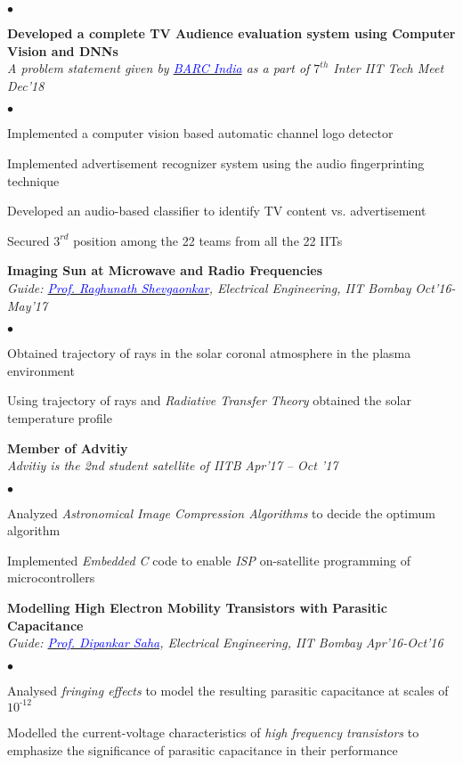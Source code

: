 \documentclass[margin,line, 9pt]{res}
\newenvironment{list2}{
  \begin{list}{$\bullet$}{%
      \setlength{\itemsep}{0.03in}
      \setlength{\parsep}{0in} \setlength{\parskip}{0in}
      \setlength{\topsep}{0in} \setlength{\partopsep}{0in} 
      \setlength{\leftmargin}{0.2in}}}{\end{list}}
\begin{document}
\begin{resume}
\begin{list2}
\end{list2}
% 
% 
{\bf Developed a complete TV Audience evaluation system using Computer Vision and DNNs} \\
{\em A problem statement given by \href{https://www.barcindia.co.in}{\textcolor{blue}{BARC India}} as a part of $7^{th}$ Inter IIT Tech Meet} \hfill {\it Dec'18}\\
\vspace*{-.13in}
\begin{list2}
\item Implemented a computer vision based automatic channel logo detector
\item Implemented advertisement recognizer system using the audio fingerprinting technique
\item Developed an audio-based classifier to identify TV content vs. advertisement
\item Secured $3^{rd}$ position among the 22 teams from all the 22 IITs
\end{list2}


{\bf Imaging Sun at Microwave and Radio Frequencies} \\
{\em Guide: \href{https://www.ee.iitb.ac.in/wiki/faculty/rks}{\textcolor{blue}{Prof. Raghunath Shevgaonkar}}, Electrical Engineering, IIT Bombay} \hfill {\it Oct'16-May'17}\\
\vspace*{-.13in}
\begin{list2}
\item Obtained trajectory of rays in the solar coronal atmosphere in the plasma environment
\item Using trajectory of rays and \emph{Radiative Transfer Theory} obtained the solar temperature profile
\end{list2}
% 
% 
{\bf Member of Advitiy} \\
{\em Advitiy is the 2nd student satellite of IITB} \hfill {\it Apr'17 -- Oct '17}\\
\vspace*{-.13in}
\begin{list2}
\item Analyzed \emph{Astronomical Image Compression Algorithms} to decide the optimum algorithm
\item Implemented \emph{Embedded C} code to enable \emph{ISP} on-satellite programming of microcontrollers
\end{list2}
% 
% 
{\bf Modelling High Electron Mobility Transistors with Parasitic Capacitance} \\
{\em Guide: \href{https://www.ee.iitb.ac.in/wiki/faculty/dsaha}{\textcolor{blue}{Prof. Dipankar Saha}}, Electrical Engineering, IIT Bombay} \hfill {\it Apr'16-Oct'16}\\
\vspace*{-.13in}
\begin{list2}
\item Analysed \emph{fringing effects} to model the resulting parasitic capacitance at scales of $10^\text{-12}$ 
\item Modelled the current-voltage characteristics of \emph{high frequency transistors} to emphasize the significance of parasitic capacitance in their performance
\end{list2}
% 
% 
% 
% 

\end{resume}
\end{document}
